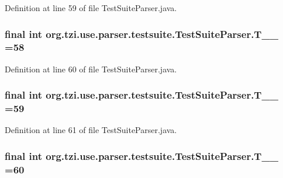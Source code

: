 Definition at line 59 of file Test\-Suite\-Parser.\-java.

\hypertarget{classorg_1_1tzi_1_1use_1_1parser_1_1testsuite_1_1_test_suite_parser_ae4e225c9d4911a03f1e83598a9083ecb}{
\subsubsection[{T\-\_\-\-\_\-58}]{\setlength{\rightskip}{0pt plus 5cm}final int org.\-tzi.\-use.\-parser.\-testsuite.\-Test\-Suite\-Parser.\-T\-\_\-\-\_ =58\hspace{0.3cm}{\ttfamily [static]}}}\label{classorg_1_1tzi_1_1use_1_1parser_1_1testsuite_1_1_test_suite_parser_ae4e225c9d4911a03f1e83598a9083ecb}


Definition at line 60 of file Test\-Suite\-Parser.\-java.

\hypertarget{classorg_1_1tzi_1_1use_1_1parser_1_1testsuite_1_1_test_suite_parser_a420ade3eb14392c06040738fb3bc26d2}{
\subsubsection[{T\-\_\-\-\_\-59}]{\setlength{\rightskip}{0pt plus 5cm}final int org.\-tzi.\-use.\-parser.\-testsuite.\-Test\-Suite\-Parser.\-T\-\_\-\-\_ =59\hspace{0.3cm}{\ttfamily [static]}}}\label{classorg_1_1tzi_1_1use_1_1parser_1_1testsuite_1_1_test_suite_parser_a420ade3eb14392c06040738fb3bc26d2}


Definition at line 61 of file Test\-Suite\-Parser.\-java.

\hypertarget{classorg_1_1tzi_1_1use_1_1parser_1_1testsuite_1_1_test_suite_parser_a439f836fe4086771d89c08d34e805088}{
\subsubsection[{T\-\_\-\-\_\-60}]{\setlength{\rightskip}{0pt plus 5cm}final int org.\-tzi.\-use.\-parser.\-testsuite.\-Test\-Suite\-Parser.\-T\-\_\-\-\_ =60\hspace{0.3cm}{\ttfamily [static]}}}\label{classorg_1_1tzi_1_1use_1_1parser_1_1testsuite_1_1_test_suite_parser_a439f836fe4086771d89c08d34e805088}


